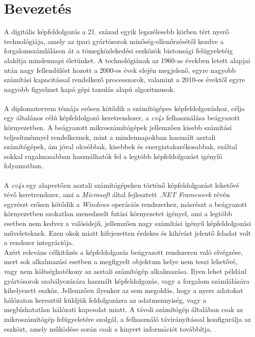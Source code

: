 \chapter{Bevezetés}

A digitális képfeldolgozás a 21. század egyik legszélesebb körben tért nyerő technológiája, amely az ipari gyártósorok minőség-ellenőrzésétől kezdve a forgalomszámláláson át a tömegközlekedési eszközök biztonsági felügyeletéig alakítja mindennapi életünket. A technológiának az 1960-as években letett alapjai után nagy fellendülést hozott a 2000-es évek elején megjelenő, egyre nagyobb számítási kapacitással rendelkező processzorok, valamint a 2010-es évektől egyre nagyobb figyelmet kapó gépi tanulás alapú algoritmusok.\\
\\
A diplomatervem témája erősen kötődik a számítógépes képfeldolgozáshoz, célja egy általános célú képfeldolgozó keretrendszer, a \emph{cv4s} felhasználása beágyazott környezetben. A beágyazott mikroszámítógépek jellemzően kisebb számítási teljesítménnyel rendelkeznek, mint a mindennapokban használt asztali számítógépek, ám jóval olcsóbbak, kisebbek és energiatakarékosabbak, ezáltal sokkal rugalmasabban használhatók fel a legtöbb képfeldolgozást igénylő folyamatban. \\
\\
A \emph{cv4s} egy alapvetően asztali számítógépeken történő képfeldolgozást lehetővé tévő keretrendszer, ami a \textit{Microsoft} által fejlesztett \emph{.NET Framework} révén egyrészt erősen kötődik a \emph{Windows} operációs rendszerhez, másrészt a beágyazott környezetben szokatlan menedzselt futási környezetet igényel, ami a legtöbb esetben nem kedvez a valósidejű, jellemzően nagy számítási igényű képfeldolgozási műveleteknek. Ezen okok miatt kifejezetten érdekes és kihívást jelentő feladat volt a rendszer integrációja. \\
Azért releváns célkitűzés a képfeldolgozás beágyazott rendszeren való elvégzése, mert sok alkalmazási esetben a megfigyelt objektum helye nem teszi lehetővé, vagy nem költséghatékony az asztali számítógép alkalmazása. Ilyen lehet például gyártósorok szabályozására használt képfeldolgozás, vagy a forgalom számlálására kihelyezett eszköz. Jellemzően ilyenkor az sem megoldás, hogy a nyers adatokat hálózaton keresztül küldjük feldolgozásra az adatmennyiség, vagy a megbízhatatlan hálózati kapcsolat miatt. A távoli számítógép általában csak az mikroszámítógép felügyeletére szolgál, a felhasználó távirányítással konfigurálja az eszközt, amely működése során csak a kinyert információt továbbítja.\\
